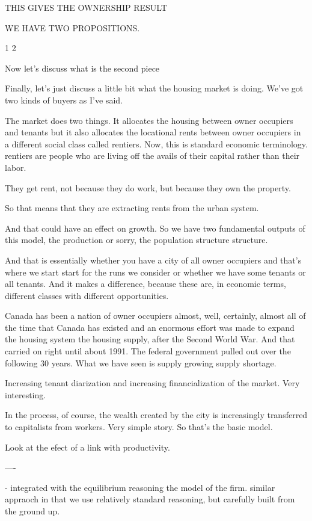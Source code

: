 THIS GIVES THE OWNERSHIP RESULT

WE HAVE TWO PROPOSITIONS.

1
2

Now let's discuss what is the second piece

Finally, let's just discuss a little bit what the housing market is doing. We've got two kinds of buyers as I've said.

The market does two things. It allocates the housing between owner occupiers and tenants but it also allocates the locational rents between owner occupiers in a different social class called rentiers. Now, this is standard economic terminology. rentiers are people who are living off the avails of their capital rather than their labor.

They get rent, not because they do work, but because they own the property.

So that means that they are extracting rents from the urban system.

And that could have an effect on growth. So we have two fundamental outputs of this model, the production or sorry, the population structure structure.

And that is essentially whether you have a city of all owner occupiers and that's where we start start for the runs we consider or whether we have some tenants or all tenants. And it makes a difference, because these are, in economic terms, different classes with different opportunities.

Canada has been a nation of owner occupiers almost, well, certainly, almost all of the time that Canada has existed and an enormous effort was made to expand the housing system the housing supply, after the Second World War. And that carried on right until about 1991. The federal government pulled out over the following 30 years. What we have seen is supply growing supply shortage.

Increasing tenant diarization and increasing financialization of the market. Very interesting.

In the process, of course, the wealth created by the city is increasingly transferred to capitalists from workers. Very simple story.
So that's the basic model.

Look at the efect of a link with productivity.

----

- integrated with the equilibrium reasoning the model of the firm.
 similar appraoch in that we use relatively standard reasoning, but carefully built from the ground up. 

